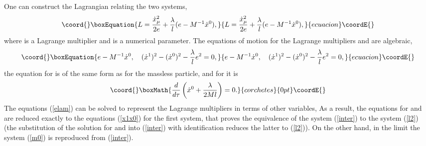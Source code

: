\documentclass[a4paper,12pt]{article}
\begin{document}
One can construct the Lagrangian
relating the two systems,
\begin{equation}\coord{}\boxEquation{
L=\frac{\dot{x}_\mu^{2}}{2e}
+\frac{\lambda}{l}(e-M^{-1}\dot{x}{}^0),
\label{inter}
}{
L=\frac{\dot{x}_\mu^{2}}{2e}
+\frac{\lambda}{l}(e-M^{-1}\dot{x}{}^0),
}{ecuacion}\coordE{}\end{equation}
where \myHighlight{$\lambda$}\coordHE{} is a Lagrange multiplier
and \coordHE{} is a numerical parameter.
The equations of motion for the  Lagrange multipliers
\myHighlight{$\lambda$}\coordHE{} and \coordHE{}
are algebraic,
\begin{equation}\coord{}\boxEquation{
e-M^{-1}\dot{x}{}^0,\quad
(\dot{x}{}^1)^2-(\dot{x}{}^0)^2-\frac{\lambda}{l}e^2=0,
\label{elam}
}{
e-M^{-1}\dot{x}{}^0,\quad
(\dot{x}{}^1)^2-(\dot{x}{}^0)^2-\frac{\lambda}{l}e^2=0,
}{ecuacion}\coordE{}\end{equation}
the equation for \coordHE{}
is of the same form as for the massless particle,
and for \coordHE{} it is
\[\coord{}\boxMath{
\frac{d}{d\tau}
\left(
\dot{x}{}^0+\frac{\lambda}{2Ml}\right)=0.
}{corchetes}{0pt}\coordE{}\]
The equations (\ref{elam})
can be solved to represent the
Lagrange multipliers in terms of other
variables,
\coordHE{}  \coordHE{}
As a result,
the equations
for \coordHE{} and \coordHE{}
are reduced exactly
to the equations (\ref{x1x0}) for the first system,
that proves the equivalence of the system
(\ref{inter}) to the system (\ref{l2})
(the substitution of the solution for \coordHE{} and \myHighlight{$\lambda$}\coordHE{}
into (\ref{inter}) with identification \coordHE{}
reduces the latter to (\ref{l2})).
On the other hand,
in the limit \coordHE{}
the system (\ref{m0}) is
reproduced from (\ref{inter}).
\end{document}
